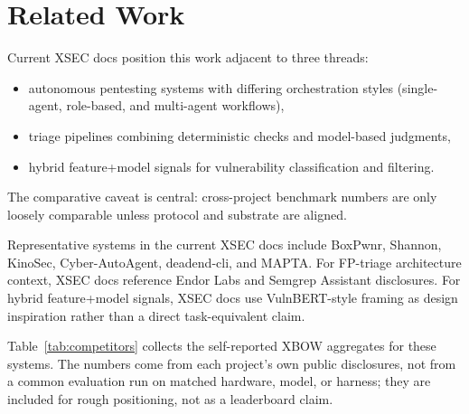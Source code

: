 \documentclass[11pt]{article}
\begin{document}
\section{Related Work}

Current XSEC docs position this work adjacent to three threads:

\begin{itemize}
  \item autonomous pentesting systems with differing orchestration styles
  (single-agent, role-based, and multi-agent workflows),
  \item triage pipelines combining deterministic checks and model-based
  judgments,
  \item hybrid feature+model signals for vulnerability classification and
  filtering.
\end{itemize}

The comparative caveat is central: cross-project benchmark numbers are only
loosely comparable unless protocol and substrate are aligned.

Representative systems in the current XSEC docs include BoxPwnr, Shannon,
KinoSec, Cyber-AutoAgent, deadend-cli, and
MAPTA\citep{boxpwnr,shannon,kinosec,cyberautoagent,deadend,mapta}.
For FP-triage architecture context, XSEC docs reference Endor Labs and
Semgrep Assistant disclosures\citep{endor,semgrep}. For hybrid feature+model
signals, XSEC docs use VulnBERT-style framing as design inspiration rather
than a direct task-equivalent claim\citep{vulnbert}.

Table~\ref{tab:competitors} collects the self-reported XBOW aggregates for
these systems. The numbers come from each project's own public disclosures,
not from a common evaluation run on matched hardware, model, or harness; they
are included for rough positioning, not as a leaderboard claim.
\end{document}
